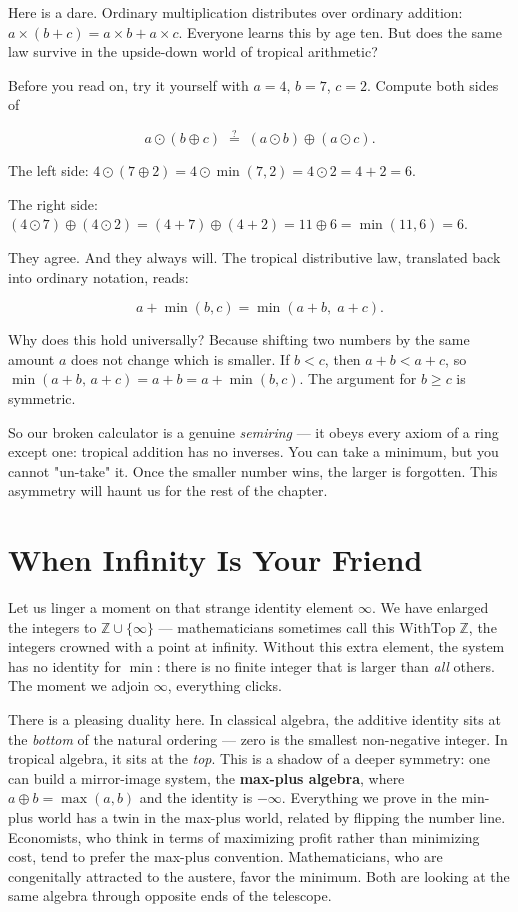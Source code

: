 \documentclass[11pt,twoside,openright]{book}
\theoremstyle{definition}
\theoremstyle{remark}
\begin{document}
Here is a dare. Ordinary multiplication distributes over ordinary addition: $a \times (b + c) = a \times b + a \times c$. Everyone learns this by age ten. But does the same law survive in the upside-down world of tropical arithmetic?

Before you read on, try it yourself with $a = 4$, $b = 7$, $c = 2$. Compute both sides of

\[a \odot (b \oplus c) \;\stackrel{?}{=}\; (a \odot b) \oplus (a \odot c).\]

The left side: $4 \odot (7 \oplus 2) = 4 \odot \min(7,2) = 4 \odot 2 = 4 + 2 = 6$.

The right side: $(4 \odot 7) \oplus (4 \odot 2) = (4+7) \oplus (4+2) = 11 \oplus 6 = \min(11, 6) = 6$.

They agree. And they always will. The tropical distributive law, translated back into ordinary notation, reads:

\[a + \min(b, c) = \min(a + b,\; a + c).\]

Why does this hold universally? Because shifting two numbers by the same amount $a$ does not change which is smaller. If $b < c$, then $a + b < a + c$, so $\min(a + b,\, a + c) = a + b = a + \min(b,c)$. The argument for $b \ge c$ is symmetric.


So our broken calculator is a genuine \textit{semiring} --- it obeys every axiom of a ring except one: tropical addition has no inverses. You can take a minimum, but you cannot "un-take" it. Once the smaller number wins, the larger is forgotten. This asymmetry will haunt us for the rest of the chapter.


\section{When Infinity Is Your Friend}

Let us linger a moment on that strange identity element $\infty$. We have enlarged the integers to $\mathbb{Z} \cup \{\infty\}$ --- mathematicians sometimes call this $\text{WithTop}\;\mathbb{Z}$, the integers crowned with a point at infinity. Without this extra element, the system has no identity for $\min$: there is no finite integer that is larger than \textit{all} others. The moment we adjoin $\infty$, everything clicks.


There is a pleasing duality here. In classical algebra, the additive identity sits at the \textit{bottom} of the natural ordering --- zero is the smallest non-negative integer. In tropical algebra, it sits at the \textit{top}. This is a shadow of a deeper symmetry: one can build a mirror-image system, the \textbf{max-plus algebra}, where $a \oplus b = \max(a,b)$ and the identity is $-\infty$. Everything we prove in the min-plus world has a twin in the max-plus world, related by flipping the number line. Economists, who think in terms of maximizing profit rather than minimizing cost, tend to prefer the max-plus convention. Mathematicians, who are congenitally attracted to the austere, favor the minimum. Both are looking at the same algebra through opposite ends of the telescope.
\end{document}
